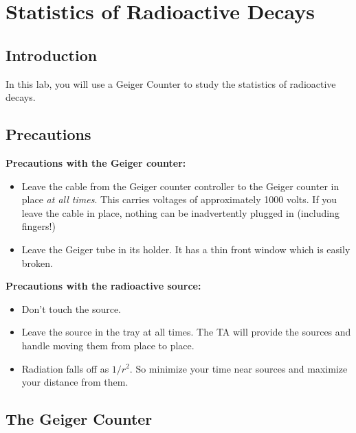 \chapter{Statistics of Radioactive Decays}


\section{Introduction}

In this lab, you will use a Geiger Counter to study the statistics of radioactive decays.


\section{Precautions}

\noindent
{\bf Precautions with the Geiger counter:}
\begin{itemize}
\item Leave the cable from the Geiger counter controller to the Geiger counter in place {\em at all times}.  This carries voltages of approximately 1000 volts.  If you leave the cable in place, nothing can be inadvertently plugged in (including fingers!)
\item Leave the Geiger tube in its holder.  It has a thin front window which is easily broken.
\end{itemize}

\noindent
{\bf Precautions with the radioactive source:}
\begin{itemize}
\item Don't touch the source.
\item Leave the source in the tray at all times.  The TA will provide the sources and handle moving them from place to place.
\item Radiation falls off as $1/r^2$.  So minimize your time near sources and maximize your distance from them.
\end{itemize}


\section{The Geiger Counter}

